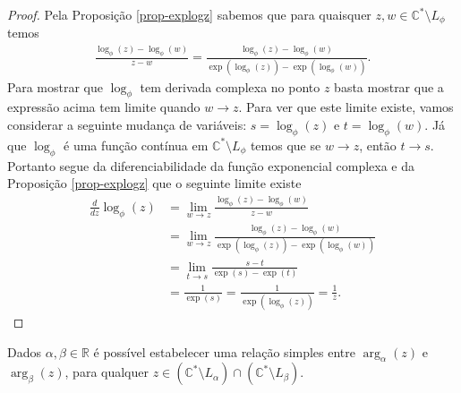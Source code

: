 \begin{proof}
Pela Proposição \ref{prop-explogz} sabemos que 
para quaisquer $z,w\in \mathbb{C}^{*}\setminus L_{\phi}$ temos
\begin{align}\label{eq-aux1-dif-logaritmo}
\frac{\log_{\phi}(z)-\log_{\phi}(w)}{z-w}
=
\frac{\log_{\phi}(z)-\log_{\phi}(w)}{\exp(\log_{\phi}(z)) -\exp(\log_{\phi}(w))}.
\end{align}
Para mostrar que $\log_{\phi}$ tem derivada complexa no ponto $z$ basta 
mostrar que a expressão acima tem limite quando $w\to z$.
Para ver que este limite existe, vamos considerar a seguinte mudança de variáveis:
$s=\log_{\phi}(z)$ e $t=\log_{\phi}(w)$. 
Já que $\log_{\phi}$ é uma função contínua em $\mathbb{C}^{*}\setminus L_{\phi}$
temos que se $w\to z$, então $t\to s$. Portanto segue da diferenciabilidade
da função exponencial complexa e da Proposição \ref{prop-explogz} 
que o seguinte limite existe
\begin{align*}
\frac{d}{dz}\log_{\phi}(z)
&=\lim_{w\to z}
\frac{\log_{\phi}(z)-\log_{\phi}(w)}{z-w}
\\[0.3cm]
&=
\lim_{w\to z}
\frac{\log_{\phi}(z)-\log_{\phi}(w)}{\exp(\log_{\phi}(z)) -\exp(\log_{\phi}(w))}
\\[0.3cm]
&=
\lim_{t\to s}
\frac{s-t}{\exp(s) -\exp(t)}
\\[0.2cm]
&=
\frac{1}{\exp(s)}
=
\frac{1}{\exp(\log_{\phi}(z))}
=
\frac{1}{z}.
\end{align*}

\end{proof}













Dados $\alpha,\beta\in \mathbb{R}$ é possível estabelecer uma relação simples entre
$\arg_{\alpha}(z)$ e $\arg_{\beta}(z)$, para qualquer 
$z\in (\mathbb{C}^{*}\setminus L_{\alpha})\cap(\mathbb{C}^{*}\setminus L_{\beta})$.

